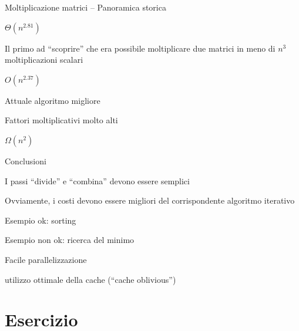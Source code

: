 \begin{frame}{Moltiplicazione matrici -- Panoramica storica}

\vspace{-9pt}
\begin{myboxtitle}
\BI
\item $\Theta(n^{2.81})$
\item Il primo ad “scoprire” che era possibile moltiplicare due matrici in meno di $n^3$ 
moltiplicazioni scalari
\EI
\end{myboxtitle}

\begin{myboxtitle}
\BI
\item $O(n^{2.37})$
\item Attuale algoritmo migliore
\item Fattori moltiplicativi molto alti
\EI
\end{myboxtitle}

\begin{myboxtitle}
\BI
\item $\Omega(n^2)$
\EI
\end{myboxtitle}

\end{frame}

\begin{frame}{Conclusioni}

\vspace{-9pt}
\BIL
\item I passi “divide” e “combina” devono essere semplici
\item Ovviamente, i costi devono essere migliori del corrispondente algoritmo iterativo
\BI 
\item Esempio ok: sorting 
\item Esempio non ok: ricerca del minimo
\EI
\EIL

\medskip
{}
\BIL
\item Facile parallelizzazione
\item utilizzo ottimale della cache (“cache oblivious”)
\EIL

\end{frame}

\section{Esercizio}

